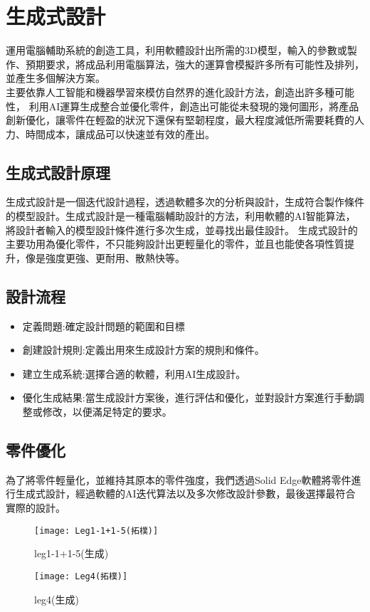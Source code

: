 \chapter{生成式設計}
運用電腦輔助系統的創造工具，利用軟體設計出所需的3D模型，輸入的參數或製作、預期要求，將成品利用電腦算法，強大的運算會模擬許多所有可能性及排列，並產生多個解決方案。\\
主要依靠人工智能和機器學習來模仿自然界的進化設計方法，創造出許多種可能性，
利用AI運算生成整合並優化零件，創造出可能從未發現的幾何圖形，將產品創新優化，讓零件在輕盈的狀況下還保有堅韌程度，最大程度減低所需要耗費的人力、時間成本，讓成品可以快速並有效的產出。\\

\section{生成式設計原理}
生成式設計是一個迭代設計過程，透過軟體多次的分析與設計，生成符合製作條件的模型設計。生成式設計是一種電腦輔助設計的方法，利用軟體的AI智能算法，將設計者輸入的模型設計條件進行多次生成，並尋找出最佳設計。
生成式設計的主要功用為優化零件，不只能夠設計出更輕量化的零件，並且也能使各項性質提升，像是強度更強、更耐用、散熱快等。\

\section{設計流程}
\begin{itemize}
\item 定義問題:確定設計問題的範圍和目標
\item 創建設計規則:定義出用來生成設計方案的規則和條件。
\item	建立生成系統:選擇合適的軟體，利用AI生成設計。
\item 優化生成結果:當生成設計方案後，進行評估和優化，並對設計方案進行手動調整或修改，以便滿足特定的要求。
\end{itemize}

\section{零件優化}
為了將零件輕量化，並維持其原本的零件強度，我們透過Solid Edge軟體將零件進行生成式設計，經過軟體的AI迭代算法以及多次修改設計參數，最後選擇最符合實際的設計。\

\begin{figure}[htbp]
  \begin{minipage}[t]{0.5\linewidth}
    \centering
    \texttt{[image: Leg1-1+1-5(拓樸)]}
    \caption{leg1-1+1-5(生成)}
    \label{Leg1-1+1-5(拓樸)}
  \end{minipage}
  \hfill
  \begin{minipage}[t]{0.4\linewidth}
    \centering
    \texttt{[image: Leg4(拓樸)]}
    \caption{leg4(生成)}
    \label{Leg4(拓樸)}
  \end{minipage}
\end{figure}
